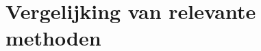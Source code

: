 \section{Vergelijking van relevante methoden}

\lipsum[1-3]

\autocite{Wang_2023}
\autocite{Zeng_2021}
\autocite{Yulin_2020}
\autocite{Chen_2017}